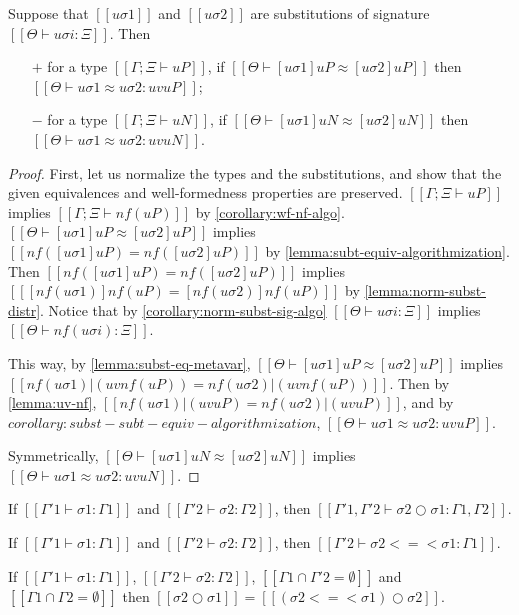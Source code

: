 \begin{corollary}
  \label{lemma:subst-equiv-metavar}
  Suppose that $[[uσ1]]$ and $[[uσ2]]$ are substitutions 
  of signature $[[Θ ⊢ uσi : Ξ]]$.
  Then 
  \begin{enumerate}
    \item [$+$] for a type $[[Γ; Ξ ⊢ uP]]$, if $[[Θ ⊢ [uσ1]uP ≈ [uσ2]uP]]$ then
      $[[Θ ⊢ uσ1 ≈ uσ2 : uv uP]]$;
    \item [$-$] for a type $[[Γ; Ξ ⊢ uN]]$, if $[[Θ ⊢ [uσ1]uN ≈ [uσ2]uN]]$ then
      $[[Θ ⊢ uσ1 ≈ uσ2 : uv uN]]$.
  \end{enumerate}
\end{corollary}
\begin{proof}
  First, let us normalize the types and the substitutions, and show that
  the given equivalences and well-formedness properties are preserved. 
  $[[Γ; Ξ ⊢ uP]]$ implies $[[Γ; Ξ ⊢ nf(uP)]]$ by \cref{corollary:wf-nf-algo}.
  $[[Θ ⊢ [uσ1]uP ≈ [uσ2]uP]]$ implies $[[ nf([uσ1]uP) = nf([uσ2]uP)]]$ by 
  \cref{lemma:subt-equiv-algorithmization}.
  Then $[[ nf([uσ1]uP) = nf([uσ2]uP)]]$ implies 
  $[[ [nf(uσ1)]nf(uP) = [nf(uσ2)]nf(uP)]]$ by \cref{lemma:norm-subst-distr}.
  Notice that by \cref{corollary:norm-subst-sig-algo}
  $[[Θ ⊢ uσi : Ξ]]$ implies $[[Θ ⊢ nf(uσi) : Ξ]]$.

  This way, by \cref{lemma:subst-eq-metavar}, 
  $[[Θ ⊢ [uσ1]uP ≈ [uσ2]uP]]$ implies 
  $[[nf(uσ1)|(uv nf(uP)) = nf(uσ2)|(uv nf(uP))]]$.
  Then by \cref{lemma:uv-nf}, 
  $[[nf(uσ1)|(uv uP) = nf(uσ2)|(uv uP)]]$,
  and by ${{corollary:subst-subt-equiv-algorithmization}}$,
  $[[Θ ⊢ uσ1 ≈ uσ2 : uv uP]]$.

  Symmetrically, 
  $[[Θ ⊢ [uσ1]uN ≈ [uσ2]uN]]$ implies 
  $[[Θ ⊢ uσ1 ≈ uσ2 : uv uN]]$.
\end{proof}

\begin{lemma}
  If $[[Γ'1 ⊢ σ1 : Γ1]]$ and $[[Γ'2 ⊢ σ2 : Γ2]]$,
  then $[[Γ'1, Γ'2 ⊢ σ2 ○ σ1 : Γ1, Γ2]]$.
\end{lemma}

\begin{lemma}
  \label{lemma:subst-monad-composition-wf}
  If $[[Γ'1 ⊢ σ1 : Γ1]]$ and $[[Γ'2 ⊢ σ2 : Γ2]]$,
  then $[[Γ'2 ⊢ σ2 <=< σ1 : Γ1]]$.
\end{lemma}

\begin{lemma}
  \label{lemma:subst-composition}
    If $[[Γ'1 ⊢ σ1 : Γ1]]$, $[[Γ'2 ⊢ σ2 : Γ2]]$, 
    $[[Γ1 ∩ Γ'2 = ∅ ]]$ and $[[ Γ1 ∩ Γ2 = ∅ ]]$ then 
    $[[ σ2 ○ σ1 ]] = [[ (σ2 <=< σ1) ○ σ2 ]]$.
\end{lemma}

